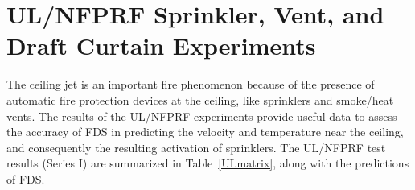 \clearpage

\section{UL/NFPRF Sprinkler, Vent, and Draft Curtain Experiments}
\label{UL_NFPRF:Results}

The ceiling jet is an important fire phenomenon because of the presence of automatic fire protection devices at the ceiling, like
sprinklers and smoke/heat vents. The results of the UL/NFPRF experiments provide useful data to assess the accuracy of FDS in predicting
the velocity and temperature near the ceiling, and consequently the resulting activation of sprinklers.
The UL/NFPRF test results (Series I) are summarized in Table~\ref{ULmatrix}, along with the predictions of FDS.

